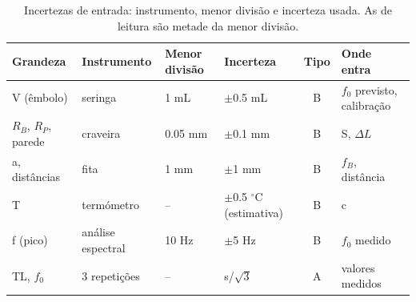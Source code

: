 \begin{table}[h]
\centering
\small
\caption{Incertezas de entrada: instrumento, menor divisão e incerteza usada. As de leitura são metade da menor divisão.}
\label{tab:entradas}
\begin{tabular}{llllcl}
\toprule
Grandeza & Instrumento & Menor divisão & Incerteza & Tipo & Onde entra \\
\midrule
V (êmbolo) & seringa & 1 mL & $\pm$0.5 mL & B & $f_0$ previsto, calibração \\
$R_B$, $R_P$, parede & craveira & 0.05 mm & $\pm$0.1 mm & B & S, $\Delta L$ \\
a, distâncias & fita & 1 mm & $\pm$1 mm & B & $f_B$, distância \\
T & termómetro & – & $\pm$0.5 $^\circ$C (estimativa) & B & c \\
f (pico) & análise espectral & 10 Hz & $\pm$5 Hz & B & $f_0$ medido \\
TL, $f_0$ & 3 repetições & – & s/$\sqrt{3}$ & A & valores medidos \\
\bottomrule
\end{tabular}
\end{table}
